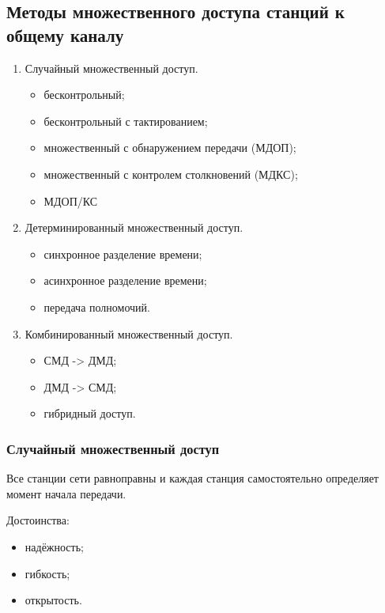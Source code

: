 \documentclass[12pt, russian, oneside, article]{ncc}
\begin{document}
\subsection{Методы множественного доступа станций к общему каналу}
\label{sec-5_1}


\begin{enumerate}
\item Случайный множественный доступ.

\begin{itemize}
\item бесконтрольный;
\item бесконтрольный с тактированием;
\item множественный с обнаружением передачи (МДОП);
\item множественный с контролем столкновений (МДКС);
\item МДОП/КС
\end{itemize}

\item Детерминированный множественный доступ.

\begin{itemize}
\item синхронное разделение времени;
\item асинхронное разделение времени;
\item передача полномочий.
\end{itemize}

\item Комбинированный множественный доступ.

\begin{itemize}
\item СМД -> ДМД;
\item ДМД -> СМД;
\item гибридный доступ.
\end{itemize}

\end{enumerate}
\subsubsection{Случайный множественный доступ}
\label{sec-5_1_1}


Все станции сети равноправны и каждая станция самостоятельно определяет момент начала передачи.

Достоинства:
\begin{itemize}
\item надёжность;
\item гибкость;
\item открытость.
\end{itemize}
\end{document}
